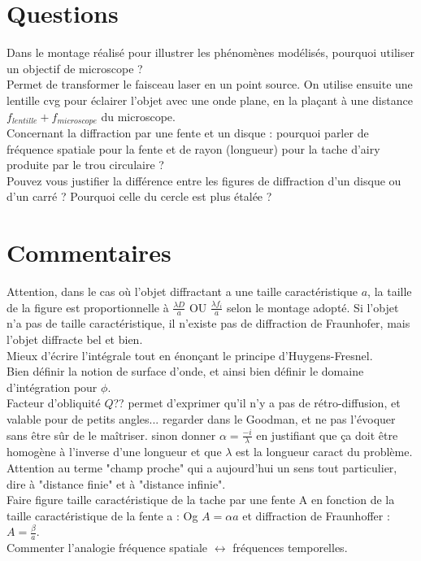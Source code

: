 \documentclass[12pt,prb,aps,epsf]{report}
\begin{document}
\section*{Questions}
Dans le montage réalisé pour illustrer les phénomènes modélisés, pourquoi utiliser un objectif de microscope ?\\
Permet de transformer le faisceau laser en un point source. On utilise ensuite une lentille cvg pour éclairer l'objet avec une onde plane, en la plaçant à une distance $f_{lentille}+f_{microscope}$ du microscope.\\

Concernant la diffraction par une fente et un disque : pourquoi parler de fréquence spatiale pour la fente et de rayon (longueur) pour la tache d'airy produite par le trou circulaire ?\\

Pouvez vous justifier la différence entre les figures de diffraction d'un disque ou d'un carré ? Pourquoi celle du cercle est plus étalée ?\\

\section*{Commentaires}
Attention, dans le cas où l'objet diffractant a une taille caractéristique $a$, la taille de la figure est proportionnelle à $\frac{\lambda D}{a}$ OU $\frac{\lambda f_i}{a}$ selon le montage adopté. Si l'objet n'a pas de taille caractéristique, il n'existe pas de diffraction de Fraunhofer, mais l'objet diffracte bel et bien.\\
Mieux d'écrire l'intégrale tout en énonçant le principe d'Huygens-Fresnel.\\
Bien définir la notion de surface d'onde, et ainsi bien définir le domaine d'intégration pour $\phi$.\\
Facteur d'obliquité $Q$?? permet d'exprimer qu'il n'y a pas de rétro-diffusion, et valable pour de petits angles... regarder dans le Goodman, et ne pas l'évoquer sans être sûr de le maîtriser. sinon donner $\alpha = \frac{-i}{\lambda}$ en justifiant que ça doit être homogène à l'inverse d'une longueur et que $\lambda$ est la longueur caract du problème.\\
Attention au terme "champ proche" qui a aujourd'hui un sens tout particulier, dire à "distance finie" et à "distance infinie".\\
Faire figure taille caractéristique de la tache par une fente A en fonction de la taille caractéristique de la fente a : Og $A=\alpha a$ et diffraction de Fraunhoffer : $A = \frac{\beta}{a}$.\\
Commenter l'analogie fréquence spatiale $\leftrightarrow$ fréquences temporelles.
\end{document}
